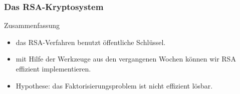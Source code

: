 \documentclass{beamer}
\renewcommand{\oe}{\"o}
\newcommand{\ue}{\"u}
\newcommand{\mytitle}{Das RSA-Kryptosystem}
\begin{document}
\begin{frame}\frametitle{\mytitle}
	\begin{block}{Zusammenfassung}
		\begin{itemize}
			\item das RSA-Verfahren benutzt \oe ffentliche Schl\ue ssel.
			\item mit Hilfe der Werkzeuge aus den vergangenen Wochen k\oe nnen wir RSA effizient implementieren.
			\item \alert{Hypothese:} das Faktorisierungsproblem ist nicht effizient l\oe sbar.
		\end{itemize}
	\end{block}
\end{frame}
\end{document}
